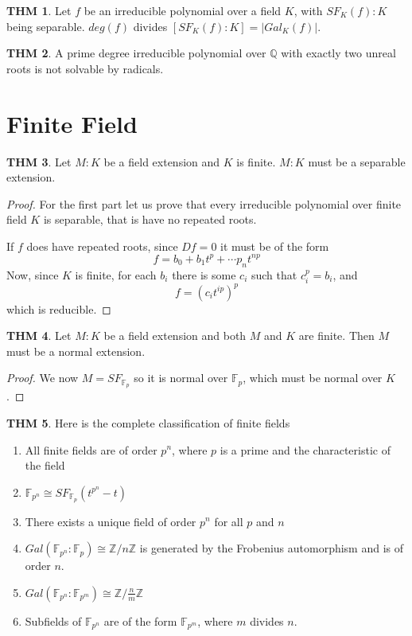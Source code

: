 \documentclass[twocolumn]{article}
\newcommand{\Z}{\mathbb{Z}}
\newcommand{\F}{\mathbb{F}}
\newcommand{\Q}{\mathbb{Q}}
\theoremstyle{definition}
\newtheorem{thm}{THM}
\theoremstyle{remark}
\begin{document}
\begin{thm}
	Let $f$ be an irreducible polynomial over a field $K$, with $SF_K(f):K$ being separable. $deg(f)$ divides $[SF_K(f):K] = |Gal_K(f)|$.
\end{thm} 

\begin{thm}
	A prime degree irreducible polynomial over $\Q$ with exactly two unreal roots is not solvable by radicals.
\end{thm}

\section{Finite Field}

\begin{thm}
	Let $M:K$ be a field extension and $K$ is finite.
	$M:K$ must be a separable extension. 
\end{thm}

\begin{proof}
	For the first part let us prove that every irreducible polynomial over finite field $K$ is separable, that is have no repeated roots. 

	If $f$ does have repeated roots, since $Df = 0$ it must be of the form 
	$$
		f = b_0 + b_1 t^p + \cdots p_n t^{np}
	$$
	Now, since $K$ is finite, for each $b_i$ there is some $c_i$ such that $c_i^p = b_i$, and 
	$$
	f = (c_i t^{ip})^p
	$$
	which is reducible.
\end{proof}

\begin{thm}
	Let $M:K$ be a field extension and both $M$ and $K$ are finite. Then $M$ must be a normal extension.
\end{thm}

\begin{proof}
	We now $M = SF_{\F_p}$ so it is normal over $\F_p$, which must be normal over $K$.
\end{proof}

\begin{thm}
	Here is the complete classification of finite fields
	\begin{enumerate}
		\item All finite fields are of order $p^n$, where $p$ is a prime and the characteristic of the field \item $\F_{p^n} \cong SF_{\F_p}(t^{p^n} - t)$
		\item There exists a unique field of order $p^n$ for all $p$ and $n$
		\item $Gal(\F_{p^n}: \F_p) \cong \Z / n\Z$ is generated by the Frobenius automorphism and is of order $n$.
		\item $Gal(\F_{p^n}: \F_{p^m}) \cong \Z / \frac{n}{m} \Z$
		\item Subfields of $\F_{p^n}$ are of the form $\F_{p^m}$, where $m$ divides $n$.
	\end{enumerate}
\end{thm}
\end{document}
